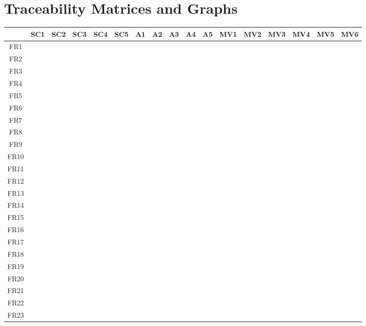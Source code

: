 \documentclass[12pt]{article}
\begin{document}
\section{Traceability Matrices and Graphs}

\begin{minipage}{\textwidth}
\renewcommand*{\arraystretch}{1.5}
\begin{tabular}{| c | c | c | c |c | c | c | c |c | c | c | c |c|c|c|c|c|}
 \hline
 &SC1 &SC2  & SC3 &  SC4& SC5&A1&A2&A3&A4&A5&MV1&MV2&MV3&MV4&MV5&MV6\\ 
 \hline
FR1& &  &  &  & &&&&&&&&&&&\\ 
  \hline
FR2 & &  &  &  & &&&&&&&&&&&\\ 
  \hline
FR3 & &  &  &  & &&&&&&&&&&&\\ 
  \hline
FR4& &  &  &  & &&&&&&&&&&&\\ 
  \hline
FR5& &  &  &  & &&&&&&&&&&&\\ 
  \hline
FR6& &  &  &  & &&&&&&&&&&&\\ 
 \hline
FR7  & &  &  &  & &&&&&&&&&&&\\ 
 \hline
FR8& &  &  &  & &&&&&&&&&&&\\ 
  \hline
FR9 & &  &  &  & &&&&&&&&&&&\\ 
  \hline
FR10 & &  &  &  & &&&&&&&&&&&\\ 
  \hline
FR11& &  &  &  & &&&&&&&&&&&\\ 
  \hline
FR12& &  &  &  & &&&&&&&&&&&\\ 
  \hline
FR13& &  &  &  & &&&&&&&&&&&\\ 
 \hline
FR14  & &  &  &  & &&&&&&&&&&&\\ 
 \hline
FR15& &  &  &  & &&&&&&&&&&&\\ 
  \hline
FR16 & &  &  &  & &&&&&&&&&&&\\ 
  \hline
FR17 & &  &  &  & &&&&&&&&&&&\\ 
  \hline
FR18& &  &  &  & &&&&&&&&&&&\\ 
  \hline
FR19& &  &  &  & &&&&&&&&&&&\\ 
  \hline
FR20& &  &  &  & &&&&&&&&&&&\\ 
 \hline
FR21  & &  &  &  & &&&&&&&&&&&\\ 
 \hline
FR22& &  &  &  & &&&&&&&&&&&\\ 
  \hline
FR23 & &  &  &  & &&&&&&&&&&&\\ 
\hline
\end{tabular}
\end{minipage}\\
\end{document}
